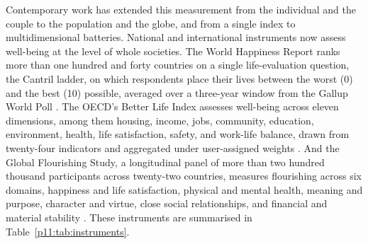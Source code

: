 Contemporary work has extended this measurement from the individual and the couple to the population and the globe, and from a single index to multidimensional batteries. National and international instruments now assess well-being at the level of whole societies. The World Happiness Report ranks more than one hundred and forty countries on a single life-evaluation question, the Cantril ladder, on which respondents place their lives between the worst (0) and the best (10) possible, averaged over a three-year window from the Gallup World Poll \parencite{whr2026}. The OECD's Better Life Index assesses well-being across eleven dimensions, among them housing, income, jobs, community, education, environment, health, life satisfaction, safety, and work-life balance, drawn from twenty-four indicators and aggregated under user-assigned weights \parencite{oecdbli}. And the Global Flourishing Study, a longitudinal panel of more than two hundred thousand participants across twenty-two countries, measures flourishing across six domains, happiness and life satisfaction, physical and mental health, meaning and purpose, character and virtue, close social relationships, and financial and material stability \parencite{vanderweele2025gfs,vanderweele2017}. These instruments are summarised in Table~\ref{p11:tab:instruments}.

